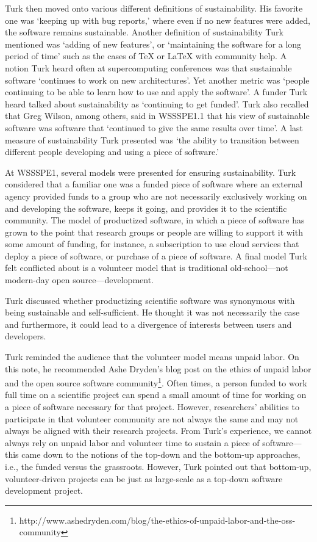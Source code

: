\documentclass[11pt, oneside]{amsart}
\begin{document}
Turk then moved onto various different definitions of sustainability. His
favorite one was `keeping up with bug reports,' where even if no new features
were added, the software remains sustainable. Another definition of
sustainability Turk mentioned was `adding of new features', or `maintaining the
software for a long period of time' such as the cases of TeX or LaTeX with
community help. A notion Turk heard often at supercomputing conferences was that
sustainable software `continues to work on new architectures'. Yet another
metric was `people continuing to be able to learn how to use and apply the
software'. A funder Turk heard talked about sustainability as `continuing to get
funded'. Turk also recalled that Greg Wilson, among others, said in WSSSPE1.1
that his view of sustainable software was software that `continued to give the
same results over time'. A last measure of sustainability Turk presented was
`the ability to transition between different people developing and using a piece
of software.'

At WSSSPE1, several models were presented for ensuring sustainability. Turk
considered that a familiar one was a funded piece of software where an external
agency provided funds to a group who are not necessarily exclusively working on
and developing the software, keeps it going, and provides it to the scientific
community. The model of productized software, in which a piece of software has
grown to the point that research groups or people are willing to support it with
some amount of funding, for instance, a subscription to use cloud services that
deploy a piece of software, or purchase of a piece of software. A final model
Turk felt conflicted about is a volunteer model that is traditional
old-school---not modern-day open source---development.

Turk discussed whether productizing scientific software was synonymous with
being sustainable and self-sufficient. He thought it was not necessarily the
case and furthermore, it could lead to a divergence of interests between users
and developers.

Turk reminded the audience that the volunteer model means unpaid labor. On this
note, he recommended Ashe Dryden's blog post on the ethics of unpaid labor and
the open source software
community\footnote{http://www.ashedryden.com/blog/the-ethics-of-unpaid-labor-and-the-oss-community}.
Often times, a person funded to work full time on a scientific project can spend
a small amount of time for working on a piece of software necessary for that
project. However, researchers' abilities to participate in that volunteer
community are not always the same and may not always be aligned with their
research projects. From Turk's experience, we cannot always rely on unpaid labor
and volunteer time to sustain a piece of software---this came down to the
notions of the top-down and the bottom-up approaches, i.e., the funded versus
the grassroots. However, Turk pointed out that bottom-up, volunteer-driven
projects can be just as large-scale as a top-down software development project.
\end{document}
